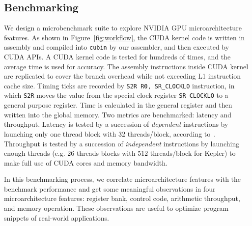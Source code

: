 \subsection{Benchmarking} %
\label{sec:benchmark}


We design a microbenchmark suite to explore NVIDIA GPU microarchitecture features.
As shown in Figure~\ref{fig:workflow}, the CUDA kernel code is written in assembly and compiled into {\tt cubin} by our assembler, and then executed by CUDA APIs.
A CUDA kernel code is tested for hundreds of times, and the average time is used for accuracy.
The assembly instructions inside CUDA kernel are replicated to cover the branch overhead while not exceeding L1 instruction cache size.
Timing ticks are recorded by {\tt S2R R0, SR\_CLOCKLO} instruction, in which
{\tt S2R} moves the value from the special clock register {\tt SR\_CLOCKLO} to a general
purpose register. 
Time is calculated in the general register and then written into the global memory.
Two metrics are benchmarked: latency and throughput. 
Latency is tested by a succession of \emph{dependent} instructions by launching only one thread block with $32$ threads/block, according to~\cite{fog}. 
Throughput is tested by a succession of \emph{independent} instructions by launching enough
threads (e.g. $26$ threads blocks with $512$ threads/block for Kepler) to make full use of CUDA cores and memory bandwidth.

In this benchmarking process, we correlate microarchitecture features with the benchmark performance and get some meaningful observations in four microarchitecture features: register bank, 
control code, arithmetic throughput, and memory operation. 
These observations are useful to optimize program snippets of real-world applications.


